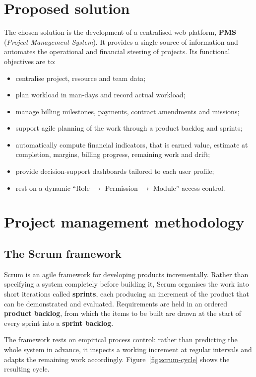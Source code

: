 \section{Proposed solution}
The chosen solution is the development of a centralised web platform, \textbf{PMS}
(\textit{Project Management System}). It provides a single source of information and automates the
operational and financial steering of projects. Its functional objectives are to:

\begin{itemize}
    \item centralise project, resource and team data;
    \item plan workload in man-days and record actual workload;
    \item manage billing milestones, payments, contract amendments and missions;
    \item support agile planning of the work through a product backlog and sprints;
    \item automatically compute financial indicators, that is earned value, estimate at completion,
          margins, billing progress, remaining work and drift;
    \item provide decision-support dashboards tailored to each user profile;
    \item rest on a dynamic ``Role $\rightarrow$ Permission $\rightarrow$ Module'' access control.
\end{itemize}

\section{Project management methodology}

\subsection{The Scrum framework}
Scrum is an agile framework for developing products incrementally. Rather than specifying a system
completely before building it, Scrum organises the work into short iterations called \textbf{sprints},
each producing an increment of the product that can be demonstrated and evaluated. Requirements are
held in an ordered \textbf{product backlog}, from which the items to be built are drawn at the
start of every sprint into a \textbf{sprint backlog}.

The framework rests on empirical process control: rather than predicting the whole system in
advance, it inspects a working increment at regular intervals and adapts the remaining work
accordingly. Figure~\ref{fig:scrum-cycle} shows the resulting cycle.

